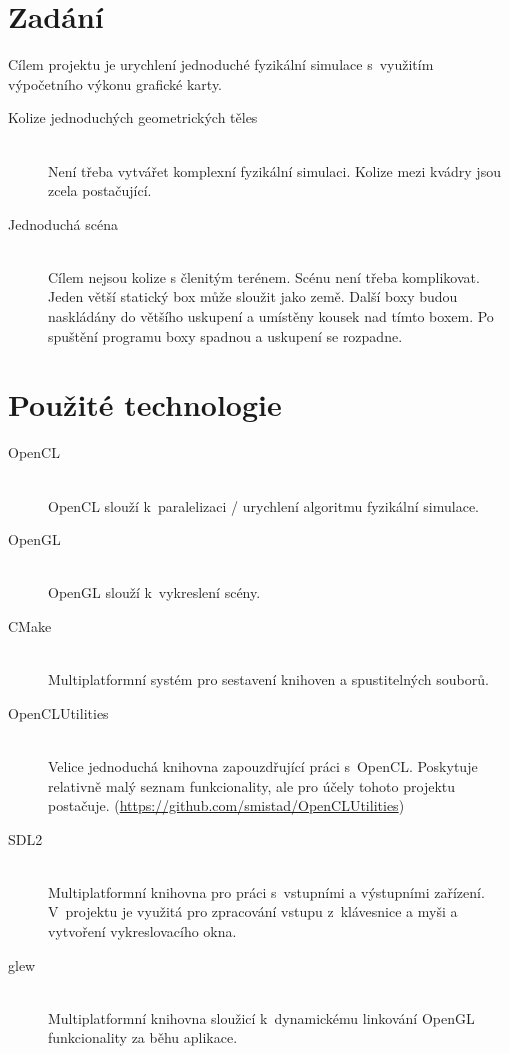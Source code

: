 \documentclass[11pt,a4paper]{article}
\begin{document}
\titlepageandcontents

\section{Zadání}

Cílem projektu je urychlení jednoduché fyzikální simulace s~využitím výpočetního
výkonu grafické karty.

\begin{description}
  \item[Kolize jednoduchých geometrických těles] ~ \\
    Není třeba vytvářet komplexní fyzikální simulaci.
    Kolize mezi kvádry jsou zcela postačující.
  \item[Jednoduchá scéna] ~ \\
    Cílem nejsou kolize s členitým terénem. Scénu není třeba komplikovat.
    Jeden větší statický box může sloužit jako země. Další boxy budou
    naskládány do většího uskupení a umístěny kousek nad tímto boxem.
    Po spuštění programu boxy spadnou a uskupení se rozpadne.
\end{description}

\section{Použité technologie}

\begin{description}
  \item[OpenCL] ~ \\
    OpenCL slouží k~paralelizaci / urychlení algoritmu fyzikální simulace.
  \item[OpenGL] ~ \\
    OpenGL slouží k~vykreslení scény.
  \item[CMake] ~ \\
    Multiplatformní systém pro sestavení knihoven a spustitelných souborů.
  \item[OpenCLUtilities] ~ \\
    Velice jednoduchá knihovna zapouzdřující práci s~OpenCL. Poskytuje relativně
    malý seznam funkcionality, ale pro účely tohoto projektu postačuje.
    (\url{https://github.com/smistad/OpenCLUtilities})
  \item[SDL2] ~ \\
    Multiplatformní knihovna pro práci s~vstupními a výstupními zařízení.
    V~projektu je využitá pro zpracování vstupu z~klávesnice a myši a vytvoření
    vykreslovacího okna.
  \item[glew] ~ \\
    Multiplatformní knihovna sloužicí k~dynamickému linkování OpenGL funkcionality
    za běhu aplikace.
\end{description}
\end{document}
